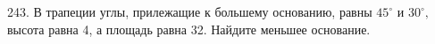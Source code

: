 243. В трапеции углы, прилежащие к большему основанию, равны $45^\circ$ и $30^\circ,$ высота равна 4, а площадь равна 32. Найдите меньшее основание.\\
